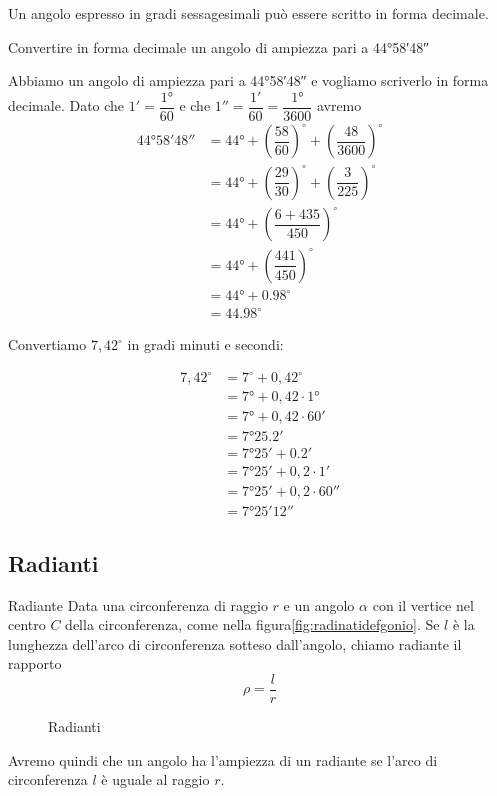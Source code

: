 Un angolo espresso in gradi sessagesimali può essere scritto in forma decimale. 
\begin{esempiot}{}{}
Convertire in forma decimale un angolo di ampiezza pari a \ang{44;58;48}
\end{esempiot}
 Abbiamo un angolo di ampiezza pari a \ang{44;58;48} e vogliamo
 scriverlo in forma decimale. Dato che $\ang{;1;}=\dfrac{\ang{1}}{60}$ e che $\ang{;;1}=\dfrac{\ang{;1;}}{60}=\dfrac{\ang{1}}{3600}$  avremo
\begin{align*}
	\ang{44;58;48}&=\ang{44}+\left(\dfrac{58}{60}\right)^{\circ}+\left(\dfrac{48}{3600} \right)^{\circ}\\
	&=\ang{44}+\left(\dfrac{29}{30}\right)^{\circ}+\left(\dfrac{3}{225} \right)^{\circ}\\
	&=\ang{44}+\left(\dfrac{6+435}{450} \right)^{\circ}\\
	&=\ang{44}+\left(\dfrac{441}{450} \right)^{\circ}\\
	&=\ang{44}+\num{0,98}^{\circ}\\
	&=\num{44,98}^{\circ}
\end{align*}
\begin{esempiot}{}{}
Convertiamo $7,42^{\circ}$ in gradi minuti e secondi:
\end{esempiot}
\begin{align*}
	7,42^{\circ}&=7^{\circ}+0,42^{\circ}\\
	&=\ang{7}+0,42\cdot \ang{1}\\
	&=\ang{7}+0,42\cdot \ang{;60;}\\
	&=\ang{7;25,2;}\\
	&=\ang{7;25;}+\ang{;0,2;}\\
	&=\ang{7;25;}+0,2\cdot\ang{;1;}\\
	&=\ang{7;25;}+0,2\cdot\ang{;;60}\\
	&=\ang{7;25;12}
\end{align*} 

\subsection{Radianti}
\begin{definizionet}{Radiante}{}
Data una circonferenza di raggio $r$ e  un angolo $\alpha$ con il vertice nel centro $C$ della circonferenza, come nella figura\nobs\vref{fig:radinatidefgonio}. Se $l$ è la lunghezza dell'arco di circonferenza sotteso dall'angolo, chiamo radiante il rapporto \[\rho=\dfrac{l}{r} \]
\end{definizionet}
\begin{figure}
	\centering
	
	\caption{Radianti}
	\label{fig:radinatidefgonio}
\end{figure}
Avremo quindi che un angolo ha l'ampiezza di un radiante se l'arco di circonferenza $l$ è uguale al raggio $r$.

